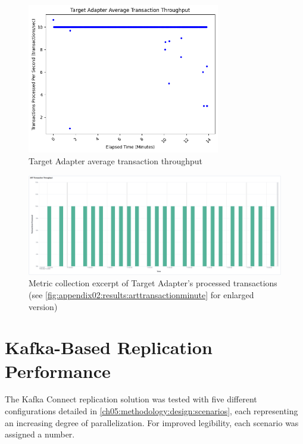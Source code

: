 \begin{figure}[htbp]
    \centering
    \includegraphics[width=0.75\textwidth]{chapters/images/art-performance/art-avg-transaction-throughput.png}
    \caption{Target Adapter average transaction throughput}
    \label{fig:chapter06:results:artavgtransaction}
\end{figure}

\begin{figure}[htbp]
    \centering
    \includegraphics[width=1\textwidth]{chapters/images/art-performance/art-transaction-throughput-minute.png}
    \caption[Metric collection excerpt of Target Adapter's processed transactions]{Metric collection excerpt of Target Adapter's processed transactions (see \ref{fig:appendix02:results:arttransactionminute} for enlarged version)}
    \label{fig:chapter06:results:arttransactionminute}
\end{figure}

\section{Kafka-Based Replication Performance}
\label{ch06:results:kafakreplicationperformance}
The Kafka Connect replication solution was tested with five different configurations detailed in \ref{ch05:methodology:design:scenarios}, each representing an increasing degree of parallelization. For improved legibility, each scenario was assigned a number.

